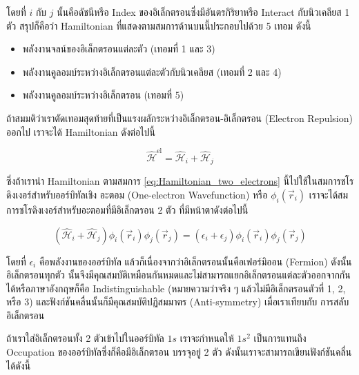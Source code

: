 \noindent โดยที่ $i$ กับ $j$ นั้นคือดัชนีหรือ Index ของอิเล็กตรอนซึ่งมีอันตรกิริยาหรือ Interact กับนิวเคลียส 1 ตัว สรุปก็คือว่า
Hamiltonian ที่แสดงตามสมการด้านบนนี้ประกอบไปด้วย 5 เทอม ดังนี้

\begin{itemize}[topsep=0pt,noitemsep]
    \setlength\itemsep{1em}
    \item พลังงานจลน์ของอิเล็กตรอนแต่ละตัว (เทอมที่ 1 และ 3)

    \item พลังงานคูลอมบ์ระหว่างอิเล็กตรอนแต่ละตัวกับนิวเคลียส (เทอมที่ 2 และ 4)

    \item พลังงานคูลอมบ์ระหว่างอิเล็กตรอน (เทอมที่ 5)
\end{itemize}

ถ้าสมมติว่าเราตัดเทอมสุดท้ายที่เป็นแรงผลักระหว่างอิเล็กตรอน-อิเล็กตรอน (Electron Repulsion) ออกไป เราจะได้ Hamiltonian ดังต่อไปนี้

\begin{equation}
    \label{eq:Hamiltonian_two_electrons}
    \hat{\mathscr{H}}^{\text{el}}
    =
    \hat{\mathscr{H}}_{i} + \hat{\mathscr{H}}_{j}
\end{equation}

\noindent ซึ่งถ้าเรานำ Hamiltonian ตามสมการ \eqref{eq:Hamiltonian_two_electrons} นี้ไปใช้ในสมการชโรดิงเงอร์สำหรับออร์บิทัลเชิง%
อะตอม (One-electron Wavefunction) หรือ $\phi_{i}(\vec{r}_{i})$ เราจะได้สมการชโรดิงเงอร์สำหรับอะตอมที่มีอิเล็กตรอน 2 ตัว
ที่มีหน้าตาดังต่อไปนี้

\begin{equation}
    \left( \hat{\mathscr{H}}_{i} + \hat{\mathscr{H}}_{j} \right)
    \phi_{i}(\vec{r}_{i})
    \phi_{j}(\vec{r}_{j})
    =
    \left( \epsilon_{i} + \epsilon_{j} \right)
    \phi_{i}(\vec{r}_{i})
    \phi_{j}(\vec{r}_{j})
\end{equation}

\noindent โดยที่ $\epsilon_{i}$ คือพลังงานของออร์บิทัล แล้วก็เนื่องจากว่าอิเล็กตรอนนั้นคือเฟอร์มิออน (Fermion) ดังนั้นอิเล็กตรอนทุกตัว%
นั้นจึงมีคุณสมบัติเหมือนกันหมดและไม่สามารถแยกอิเล็กตรอนแต่ละตัวออกจากกันได้หรือภาษาอังกฤษก็คือ Indistinguishable
(หมายความว่าจริง ๆ แล้วไม่มีอิเล็กตรอนตัวที่ 1, 2, หรือ 3) และฟังก์ชันคลื่นนั้นก็มีคุณสมบัติปฏิสมมาตร (Anti-symmetry) เมื่อเราเทียบกับ%
การสลับอิเล็กตรอน

ถ้าเราใส่อิเล็กตรอนทั้ง 2 ตัวเข้าไปในออร์บิทัล $1s$ เราจะกำหนดให้ $1 s^2$ เป็นการแทนถึง Occupation ของออร์บิทัลซึ่งก็คือมีอิเล็กตรอน%
บรรจุอยู่ 2 ตัว ดังนั้นเราจะสามารถเขียนฟังก์ชันคลื่นได้ดังนี้


